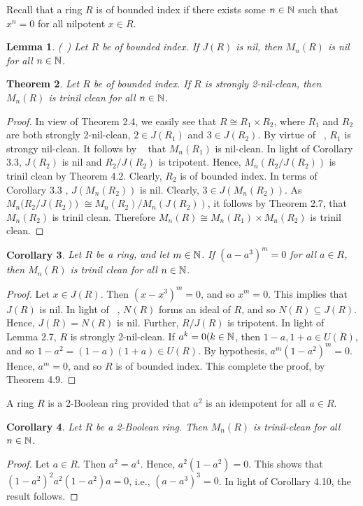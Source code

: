 \documentclass[12pt, reqno]{amsart}
\newtheorem{thm}{Theorem}[section]
\newtheorem{cor}[thm]{Corollary}
\newtheorem{lem}[thm]{Lemma}
\numberwithin{equation}{section}
\begin{document}
Recall that a ring $R$ is of bounded index if there exists some $n\in {\Bbb N}$ such that $x^n=0$ for all nilpotent $x\in R$.

\begin{lem} (~\cite[Lemma 6.6]{KWZ}) Let $R$ be of bounded index. If $J(R)$ is nil, then $M_n(R)$ is nil for all $n\in {\Bbb N}$.
\end{lem}

\begin{thm} Let $R$ be of bounded index. If $R$ is strongly 2-nil-clean, then $M_n(R)$ is trinil clean for all $n\in {\Bbb N}$.
\end{thm}
\begin{proof} In view of Theorem 2.4, we easily see that
$R\cong R_1\times R_2$, where $R_1$ and $R_2$ are both strongly 2-nil-clean, $2\in J(R_1)$ and $3\in J(R_2)$.
By virtue of ~\cite[Theorem 2.11]{CS}, $R_1$ is strongy nil-clean. It follows by ~\cite[Thorem 6.1]{KWZ} that $M_n(R_1)$ is nil-clean.
In light of Corollary 3.3, $J(R_2)$ is nil and $R_2/J(R_2)$ is tripotent.
Hence, $M_n(R_2/J(R_2))$ is trinil clean by Theorem 4.2. Clearly, $R_2$ is of bounded index. In terms of
Corollary 3.3 , $J(M_n(R_2))$ is nil. Clearly, $3\in J(M_n(R_2))$. As $M_n\big(R_2/J(R_2)\big)$ $\cong M_n(R_2)/M_n(J(R_2))$, it follows by
Theorem 2.7, that $M_n(R_2)$ is trinil clean. Therefore $M_n(R)\cong M_n(R_1)\times M_n(R_2)$ is trinil clean.\end{proof}

\begin{cor} Let $R$ be a ring, and let $m\in {\Bbb N}$. If $(a-a^3)^m=0$ for all $a\in R$, then $M_n(R)$ is trinil clean for all $n\in {\Bbb N}$.
\end{cor}
\begin{proof} Let $x\in J(R)$. Then $(x-x^3)^m=0$, and so $x^m=0$. This implies that $J(R)$ is nil. In light of ~\cite[Theorem A.1]{HT}, $N(R)$ forms an ideal of $R$, and so $N(R)\subseteq J(R)$. Hence, $J(R)=N(R)$ is nil. Further, $R/J(R)$ is tripotent. In light of Lemma 2.7, $R$ is strongly 2-nil-clean. If $a^k=0 (k\in {\Bbb N}$, then $1-a,1+a\in U(R)$, and so $1-a^2=(1-a)(1+a)\in U(R)$.
By hypothesis, $a^m(1-a^2)^m=0$. Hence, $a^m=0$, and so $R$ is of bounded index. This complete the proof, by
Theorem 4.9.\end{proof}

A ring $R$ is a 2-Boolean ring provided that $a^2$ is an idempotent for all $a\in R$.

\begin{cor} Let $R$ be a 2-Boolean ring. Then $M_n(R)$ is trinil-clean for all $n\in {\Bbb N}$.\end{cor}
\begin{proof} Let $a\in R$. Then $a^2=a^4$. Hence, $a^2(1-a^2)=0$. This shows that
$(1-a^2)^2a^2(1-a^2)a=0$, i.e., $(a-a^3)^3=0$. In light of Corollary 4.10, the result follows.\end{proof}
\end{document}
